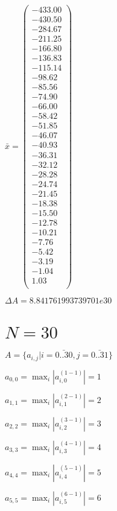 \documentclass[a4paper,12pt]{article}
\begin{document}
$\bar { x } = \begin{pmatrix}
-433.00 \\
-430.50 \\
-284.67 \\
-211.25 \\
-166.80 \\
-136.83 \\
-115.14 \\
-98.62 \\
-85.56 \\
-74.90 \\
-66.00 \\
-58.42 \\
-51.85 \\
-46.07 \\
-40.93 \\
-36.31 \\
-32.12 \\
-28.28 \\
-24.74 \\
-21.45 \\
-18.38 \\
-15.50 \\
-12.78 \\
-10.21 \\
-7.76 \\
-5.42 \\
-3.19 \\
-1.04 \\
1.03 \\
\end{pmatrix}
$

$\Delta A = 8.841761993739701e30$



\section{ $N = 30$ }
$A = \{ a _{ i, j } | i = \bar { 0..30 }, j = \bar { 0..31 } \}$

$a _{ 0, 0 } =  \max _i |a _{ i, 0 } ^{ (1 - 1) } | = 1$

$a _{ 1, 1 } =  \max _i |a _{ i, 1 } ^{ (2 - 1) } | = 2$

$a _{ 2, 2 } =  \max _i |a _{ i, 2 } ^{ (3 - 1) } | = 3$

$a _{ 3, 3 } =  \max _i |a _{ i, 3 } ^{ (4 - 1) } | = 4$

$a _{ 4, 4 } =  \max _i |a _{ i, 4 } ^{ (5 - 1) } | = 5$

$a _{ 5, 5 } =  \max _i |a _{ i, 5 } ^{ (6 - 1) } | = 6$
\end{document}
